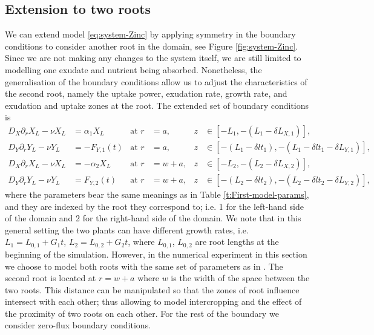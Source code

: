 \documentclass[11pt]{article}
\numberwithin{equation}{section}
\begin{document}
\subsection{Extension to two roots}
\label{sec:basemodel_extension}


We can extend model \eqref{eq:system-Zinc} by applying symmetry in the boundary conditions to consider another root in the domain, see Figure \ref{fig:system-Zinc}. Since we are not making any changes to the system itself, we are still limited to modelling one exudate and nutrient being absorbed. Nonetheless, the generalisation of the boundary conditions allow us to adjust the characteristics of the second root, namely the uptake power, exudation rate, growth rate, and exudation and uptake zones at the root. The extended set of boundary conditions is
\begin{subequations}
\label{sys:extension-two-roots}
\begin{align}
    D_X \partial_r X_L - \nu X_L &= \alpha_1 X_L & \text{at } r &= a, & z &\in [-L_1, -(L_1 - \delta L_{X,1})], \\
    D_Y \partial_r Y_L - \nu Y_L &= -F_{Y,1}(t) &\text{at } r &= a, &z &\in [-({L}_1 - \delta {lt}_1), -({L}_1 - \delta {lt}_1 - \delta {L}_{Y,1})], \\
    D_X \partial_r X_L - \nu X_L &= -\alpha_2 X_L & \text{at } r &= w+a, &z &\in [-L_2, -(L_2 - \delta L_{X,2})], \\
    D_Y \partial_r Y_L - \nu Y_L &= F_{Y,2}(t) &\text{at } r &= w+a, &z &\in [-({L}_2 - \delta {lt}_2), -({L}_2 - \delta {lt}_2 - \delta {L}_{Y,2})],
\end{align}
\end{subequations}
where the parameters bear the same meanings as in Table \ref{t:First-model-params}, and they are indexed by the root they correspond to; i.e. 1 for the left-hand side of the domain and 2 for the right-hand side of the domain. We note that in this general setting the two plants can have different growth rates, i.e. $L_1 = L_{0,1} + G_1t$, $L_2 = L_{0,2} + G_2t$, where $L_{0,1}$, $L_{0,2}$ are root lengths at the beginning of the simulation. However, in the numerical experiment in this section we choose to model both roots with the same set of parameters as in \cite{Ptashnyk-2011}. The second root is located at $r = w+a$ where $w$ is the width of the space between the two roots. This distance can be manipulated so that the zones of root influence intersect with each other; thus allowing to model intercropping and the effect of the proximity of two roots on each other. For the rest of the boundary we consider zero-flux boundary conditions.
\end{document}
